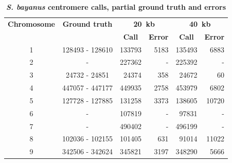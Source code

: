 \begin{table}[ht!]
\caption{\textbf{\textit{S. bayanus} centromere calls, partial ground truth and errors}}
\begin{center}
\begin{tabular}{c | c  r  r  r  r}
\textbf{Chromosome}  & \textbf{Ground truth} & \multicolumn{2}{c}{\textbf{20~kb}} & \multicolumn{2}{c}{\textbf{40~kb}} \\
  &   &  \multicolumn{1}{c}{\textbf{Call}} &  \multicolumn{1}{c}{\textbf{Error}} &  \multicolumn{1}{c}{\textbf{Call}} &  \multicolumn{1}{c}{\textbf{Error}} \\
\hline
1 & \num[group-separator={\,}]{128493} - \num[group-separator={\,}]{128610} & \num[group-separator={\,}]{133793} & \small{\num[group-separator={\,}]{5183}}  & \num[group-separator={\,}]{135493} & \small{\num[group-separator={\,}]{6883}}  \\
2 & - & \num[group-separator={\,}]{227362} & - & \num[group-separator={\,}]{225392} & - \\
3 & \num[group-separator={\,}]{24732} - \num[group-separator={\,}]{24851} & \num[group-separator={\,}]{24374} & \small{\num[group-separator={\,}]{358}}  & \num[group-separator={\,}]{24672} & \small{\num[group-separator={\,}]{60}}  \\
4 & \num[group-separator={\,}]{447057} - \num[group-separator={\,}]{447177} & \num[group-separator={\,}]{449935} & \small{\num[group-separator={\,}]{2758}}  & \num[group-separator={\,}]{453979} & \small{\num[group-separator={\,}]{6802}}  \\
5 & \num[group-separator={\,}]{127728} - \num[group-separator={\,}]{127885} & \num[group-separator={\,}]{131258} & \small{\num[group-separator={\,}]{3373}}  & \num[group-separator={\,}]{138605} & \small{\num[group-separator={\,}]{10720}}  \\
6 & - & \num[group-separator={\,}]{107819} & - & \num[group-separator={\,}]{97831} & - \\
7 & - & \num[group-separator={\,}]{490402} & - & \num[group-separator={\,}]{496199} & - \\
8 & \num[group-separator={\,}]{102036} - \num[group-separator={\,}]{102155} & \num[group-separator={\,}]{101405} & \small{\num[group-separator={\,}]{631}}  & \num[group-separator={\,}]{91014} & \small{\num[group-separator={\,}]{11022}}  \\
9 & \num[group-separator={\,}]{342506} - \num[group-separator={\,}]{342624} & \num[group-separator={\,}]{345821} & \small{\num[group-separator={\,}]{3197}}  & \num[group-separator={\,}]{348290} & \small{\num[group-separator={\,}]{5666}}  \\

\end{tabular}
\end{center}
\end{table}
